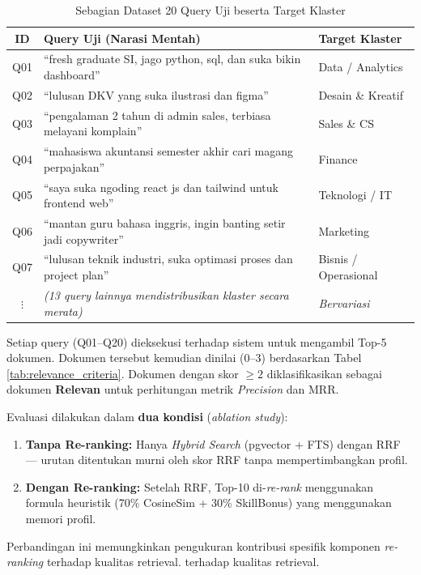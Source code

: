 \begin{table}[H]
\centering
\caption{Sebagian Dataset 20 Query Uji beserta Target Klaster}
\label{tab:ground_truth_queries}
\begin{tabularx}{\textwidth}{cXX}
\toprule
\textbf{ID} & \textbf{Query Uji (Narasi Mentah)} & \textbf{Target Klaster} \\
\midrule
Q01 & ``fresh graduate SI, jago python, sql, dan suka bikin dashboard'' & Data / Analytics \\
Q02 & ``lulusan DKV yang suka ilustrasi dan figma'' & Desain \& Kreatif \\
Q03 & ``pengalaman 2 tahun di admin sales, terbiasa melayani komplain'' & Sales \& CS \\
Q04 & ``mahasiswa akuntansi semester akhir cari magang perpajakan'' & Finance \\
Q05 & ``saya suka ngoding react js dan tailwind untuk frontend web'' & Teknologi / IT \\
Q06 & ``mantan guru bahasa inggris, ingin banting setir jadi copywriter'' & Marketing \\
Q07 & ``lulusan teknik industri, suka optimasi proses dan project plan'' & Bisnis / Operasional \\
$\vdots$ & \textit{(13 query lainnya mendistribusikan klaster secara merata)} & \textit{Bervariasi} \\
\bottomrule
\end{tabularx}
\end{table}

Setiap query (Q01--Q20) dieksekusi terhadap sistem untuk mengambil Top-5 dokumen.
Dokumen tersebut kemudian dinilai (0--3) berdasarkan Tabel \ref{tab:relevance_criteria}.
Dokumen dengan skor $\geq 2$ diklasifikasikan sebagai dokumen \textbf{Relevan}
untuk perhitungan metrik \textit{Precision} dan MRR.

Evaluasi dilakukan dalam \textbf{dua kondisi} (\textit{ablation study}):
\begin{enumerate}[noitemsep]
  \item \textbf{Tanpa Re-ranking:} Hanya \textit{Hybrid Search} (pgvector + FTS) dengan
    RRF --- urutan ditentukan murni oleh skor RRF tanpa mempertimbangkan profil.
  \item \textbf{Dengan Re-ranking:} Setelah RRF, Top-10 di-\textit{re-rank} menggunakan
    formula heuristik (70\% CosineSim + 30\% SkillBonus) yang menggunakan memori profil.
\end{enumerate}
Perbandingan ini memungkinkan pengukuran kontribusi spesifik komponen \textit{re-ranking}
terhadap kualitas retrieval.
terhadap kualitas retrieval.

